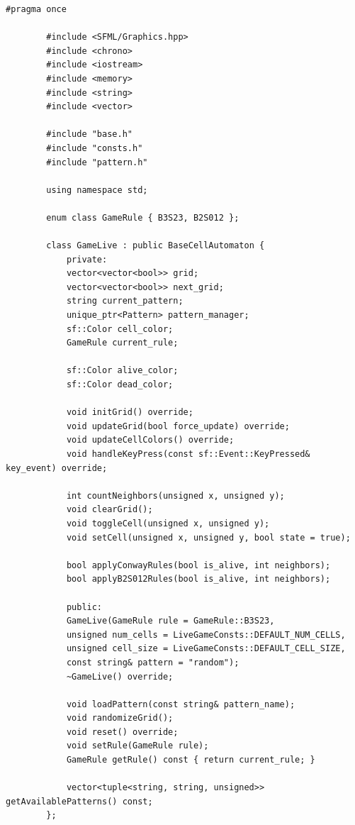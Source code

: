 \documentclass[14pt,a4paper]{extarticle}
\theoremstyle{plain}
\begin{document}
	\begin{lstlisting}[title=live.h, gobble=16, breaklines=true, showspaces=false, showtabs=false, breakatwhitespace=true]
		#pragma once
		
		#include <SFML/Graphics.hpp>
		#include <chrono>
		#include <iostream>
		#include <memory>
		#include <string>
		#include <vector>
		
		#include "base.h"
		#include "consts.h"
		#include "pattern.h"
		
		using namespace std;
		
		enum class GameRule { B3S23, B2S012 };
		
		class GameLive : public BaseCellAutomaton {
			private:
			vector<vector<bool>> grid;
			vector<vector<bool>> next_grid;
			string current_pattern;
			unique_ptr<Pattern> pattern_manager;
			sf::Color cell_color;
			GameRule current_rule;
			
			sf::Color alive_color;
			sf::Color dead_color;
			
			void initGrid() override;
			void updateGrid(bool force_update) override;
			void updateCellColors() override;
			void handleKeyPress(const sf::Event::KeyPressed& key_event) override;
			
			int countNeighbors(unsigned x, unsigned y);
			void clearGrid();
			void toggleCell(unsigned x, unsigned y);
			void setCell(unsigned x, unsigned y, bool state = true);
			
			bool applyConwayRules(bool is_alive, int neighbors);
			bool applyB2S012Rules(bool is_alive, int neighbors);
			
			public:
			GameLive(GameRule rule = GameRule::B3S23,
			unsigned num_cells = LiveGameConsts::DEFAULT_NUM_CELLS,
			unsigned cell_size = LiveGameConsts::DEFAULT_CELL_SIZE,
			const string& pattern = "random");
			~GameLive() override;
			
			void loadPattern(const string& pattern_name);
			void randomizeGrid();
			void reset() override;
			void setRule(GameRule rule);
			GameRule getRule() const { return current_rule; }
			
			vector<tuple<string, string, unsigned>> getAvailablePatterns() const;
		};
	\end{lstlisting}
	
\end{document}
